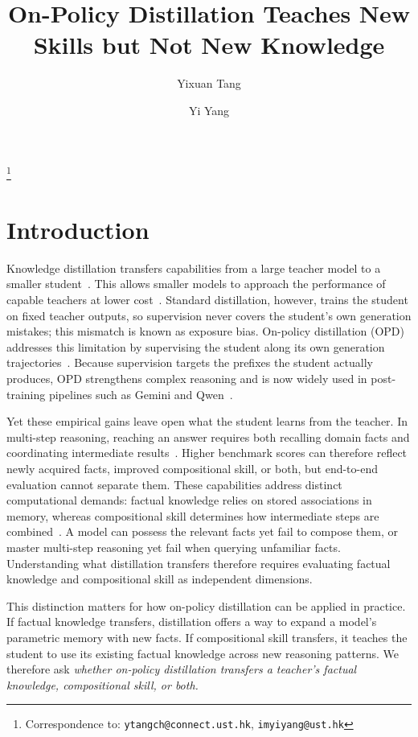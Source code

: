 \documentclass[]{template}
\title{On-Policy Distillation Teaches New Skills but Not New Knowledge}
\author{Yixuan Tang}
\author{Yi Yang}
\affil{The Hong Kong University of Science and Technology}
\theoremstyle{plain}
\theoremstyle{definition}
\theoremstyle{remark}
\newcommand\blfootnote[1]{%
  \begingroup
  \renewcommand\thefootnote{}\footnote{#1}%
  \addtocounter{footnote}{-1}%
  \endgroup
}
\begin{document}
\blfootnote{
Correspondence to: \texttt{ytangch@connect.ust.hk}, \texttt{imyiyang@ust.hk}
}
\maketitle


\section{Introduction}
\label{sec:intro}

    
Knowledge distillation transfers capabilities from a large teacher model to a smaller student~\citep{hinton2015distilling,kim2016sequence,cloud2026language}. This allows smaller models to approach the performance of capable teachers at lower cost~\citep{zheng2025learning}. Standard distillation, however, trains the student on fixed teacher outputs, so supervision never covers the student's own generation mistakes; this mismatch is known as exposure bias. On-policy distillation (OPD) addresses this limitation by supervising the student along its own generation trajectories~\citep{agarwal2024policy,gu2024minillm,lu2025onpolicydistillation}. Because supervision targets the prefixes the student actually produces, OPD strengthens complex reasoning and is now widely used in post-training pipelines such as Gemini and Qwen~\citep{team2024gemini,2025qwen3}.


Yet these empirical gains leave open what the student learns from the teacher. In multi-step reasoning, reaching an answer requires both recalling domain facts and coordinating intermediate results~\citep{newell1972human}. Higher benchmark scores can therefore reflect newly acquired facts, improved compositional skill, or both, but end-to-end evaluation cannot separate them. These capabilities address distinct computational demands: factual knowledge relies on stored associations in memory, whereas compositional skill determines how intermediate steps are combined~\citep{morris2026how,lake2023human,yuan2026f}. A model can possess the relevant facts yet fail to compose them, or master multi-step reasoning yet fail when querying unfamiliar facts. Understanding what distillation transfers therefore requires evaluating factual knowledge and compositional skill as independent dimensions.

This distinction matters for how on-policy distillation can be applied in practice. If factual knowledge transfers, distillation offers a way to expand a model's parametric memory with new facts. If compositional skill transfers, it teaches the student to use its existing factual knowledge across new reasoning patterns. We therefore ask 
\textit{whether on-policy distillation transfers a teacher's factual knowledge, compositional skill, or both.}
\end{document}
